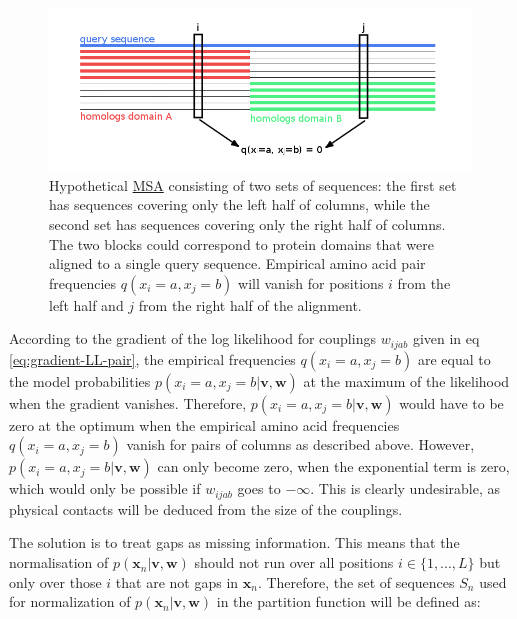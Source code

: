 \documentclass[11pt,a4paper,twoside]{book}
\newcommand{\eq}{\!=\!}
\newcommand{\seq}{\mathbf{x}}
\newcommand{\Sn}{S_n}
\renewcommand{\v}{\mathbf{v}}
\newcommand{\w}{\mathbf{w}}
\newcommand{\wijab}{w_{ijab}}
\theoremstyle{definition}
\theoremstyle{definition}
\theoremstyle{remark}
\begin{document}
\begin{figure}

{\centering \includegraphics[width=1\linewidth]{img/gap_treatment} 

}

\caption{Hypothetical \protect\hyperlink{abbrev}{MSA}
consisting of two sets of sequences: the first set has sequences
covering only the left half of columns, while the second set has
sequences covering only the right half of columns. The two blocks could
correspond to protein domains that were aligned to a single query
sequence. Empirical amino acid pair frequencies
\(q(x_i \eq a, x_j \eq b)\) will vanish for positions \(i\) from the
left half and \(j\) from the right half of the alignment.}\label{fig:gap-treatment}
\end{figure}

According to the gradient of the log likelihood for couplings \(\wijab\)
given in eq \eqref{eq:gradient-LL-pair}, the empirical frequencies
\(q(x_{i} \eq a, x_{j} \eq b)\) are equal to the model probabilities
\(p(x_i \eq a, x_j \eq b | \v,\w)\) at the maximum of the likelihood
when the gradient vanishes. Therefore,
\(p(x_i \eq a, x_j \eq b | \v, \w)\) would have to be zero at the
optimum when the empirical amino acid frequencies
\(q(x_i \eq a, x_j \eq b)\) vanish for pairs of columns as described
above. However, \(p(x_i \eq a, x_j \eq b | \v, \w)\) can only become
zero, when the exponential term is zero, which would only be possible if
\(\wijab\) goes to \(−\infty\). This is clearly undesirable, as physical
contacts will be deduced from the size of the couplings.

The solution is to treat gaps as missing information. This means that
the normalisation of \(p(\seq_n | \v, \w)\) should not run over all
positions \(i \in \{1,... , L\}\) but only over those \(i\) that are not
gaps in \(\seq_n\). Therefore, the set of sequences \(\Sn\) used for
normalization of \(p(\seq_n | \v, \w)\) in the partition function will
be defined as:
\end{document}

